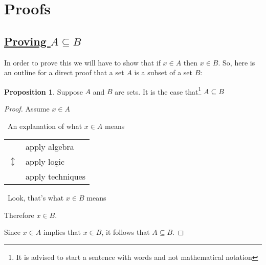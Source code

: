 \documentclass{amsart} %
\theoremstyle{definition} %
\theoremstyle{definition}
\newtheorem*{prpn}{Proposition}
\theoremstyle{remark} %
\begin{document}
\bigskip \bigskip \bigskip \bigskip \bigskip

\section{\textbf{Proofs}}

\subsection{\underline{Proving $A \subseteq B$}}\hspace*{\fill} %

In order to prove this we will have to show that if $x \in A$ then $x \in B$. So, here is an outline for a direct proof that a set $A$ is a subset of a set $B$:

\begin{prpn}
Suppose $A$ and $B$ are sets. It is the case that\footnote{It is advised to start a sentence with words and not mathematical notation} $A \subseteq B$
\end{prpn}

\begin{proof}
Assume $x \in A$

      \begin{center}
            \guillemotleft\ An explanation of what $ x \in A$ means \guillemotright
      \end{center}

      \begin{center}
      \begin{tabular}{r l}
            \multirow{3}{*}{\huge $\updownarrow$} & apply algebra \\ %
            & apply logic \\
            & apply techniques \\
      \end{tabular}
      \end{center}

      \begin{center}
            \guillemotleft\ Look, that's what $x \in B$ means \guillemotright
      \end{center}

      Therefore $x \in B$.

      Since $x \in A$ implies that $x \in B$, it follows that $A \subseteq B$.

\end{proof}
\end{document}
